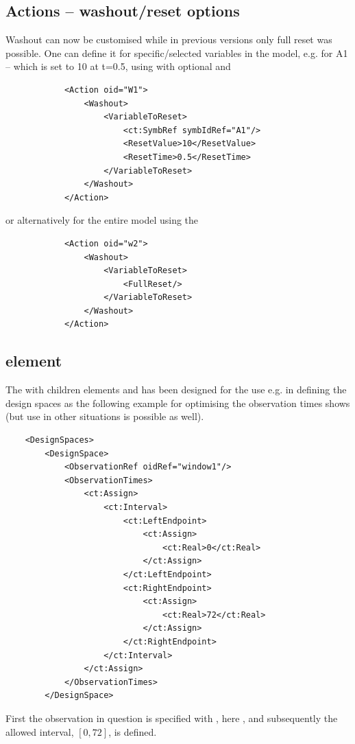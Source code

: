 \subsection{Actions -- washout/reset options}
Washout can now be customised while in previous versions only
full reset was possible. One can define it for specific/selected variables 
in the model, e.g. for A1 -- which is set to 10 at t=0.5, using 
 with optional  and 
\lstset{language=XML}
\begin{lstlisting}
            <Action oid="W1">
                <Washout>
                    <VariableToReset>
                        <ct:SymbRef symbIdRef="A1"/>
                        <ResetValue>10</ResetValue>
                        <ResetTime>0.5</ResetTime>
                    </VariableToReset>
                </Washout>
            </Action>
\end{lstlisting}
or alternatively for the entire model using the 
\lstset{language=XML}
\begin{lstlisting}
            <Action oid="w2">
                <Washout>
                    <VariableToReset>
                        <FullReset/>
                    </VariableToReset>
                </Washout>
            </Action>
\end{lstlisting}

\subsection{ element}
\label{subsec:interval}
The  with children elements  and 
has been designed for the use e.g. in defining the design spaces as the 
following example for optimising the observation times shows (but use in other 
situations is possible as well). 
\lstset{language=XML}
\begin{lstlisting}
    <DesignSpaces>
        <DesignSpace>
            <ObservationRef oidRef="window1"/>
            <ObservationTimes>
                <ct:Assign>
                    <ct:Interval>
                        <ct:LeftEndpoint>
                            <ct:Assign>
                                <ct:Real>0</ct:Real>
                            </ct:Assign>
                        </ct:LeftEndpoint>
                        <ct:RightEndpoint>
                            <ct:Assign>
                                <ct:Real>72</ct:Real>
                            </ct:Assign>
                        </ct:RightEndpoint>
                    </ct:Interval>
                </ct:Assign>
            </ObservationTimes>
        </DesignSpace>
\end{lstlisting}
First the observation in question is specified with , 
here , and subsequently the allowed interval, $[0,72]$, is defined.

